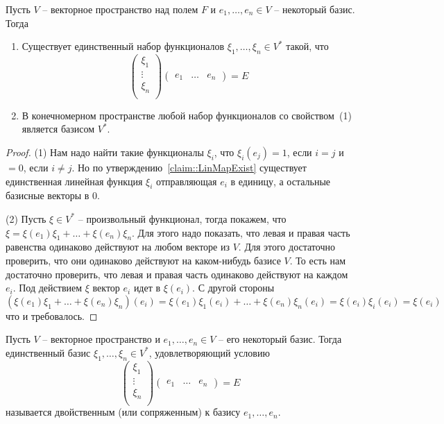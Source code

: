 \begin{claim}\label{claim:DualBasis}
Пусть $V$ -- векторное пространство над полем $F$ и $e_1,\ldots,e_n\in V$ -- некоторый базис. Тогда
\begin{enumerate}
\item Существует единственный набор функционалов $\xi_1,\ldots,\xi_n\in V^*$ такой, что 
\[
\begin{pmatrix}
{\xi_1}\\{\vdots}\\{\xi_n}\\
\end{pmatrix}
\begin{pmatrix}
{e_1}&{\ldots}&{e_n}
\end{pmatrix}
=
E
\]

\item В конечномерном пространстве любой набор функционалов со свойством~(1) является базисом $V^*$.
\end{enumerate}
\end{claim}
\begin{proof}
(1) Нам надо найти такие функционалы $\xi_i$, что $\xi_i(e_j) = 1$, если $i = j$ и $ = 0$, если $i\neq j$. Но по утверждению~\ref{claim::LinMapExist} существует единственная линейная функция $\xi_i$ отправляющая $e_i$ в единицу, а остальные базисные векторы в $0$. 

(2) Пусть $\xi \in V^*$ -- произвольный функционал, тогда покажем, что $\xi = \xi(e_1)\xi_1 + \ldots + \xi(e_n)\xi_n$. Для этого надо показать, что левая и правая часть равенства одинаково действуют на любом векторе из $V$. Для этого достаточно проверить, что они одинаково действуют на каком-нибудь базисе $V$. То есть нам достаточно проверить, что левая и правая часть одинаково действуют на каждом $e_i$. Под действием $\xi$ вектор $e_i$ идет в $\xi(e_i)$. С другой стороны
\[
(\xi(e_1)\xi_1 + \ldots + \xi(e_n)\xi_n)(e_i) = \xi(e_1)\xi_1(e_i) + \ldots + \xi(e_n)\xi_n(e_i) = \xi(e_i)\xi_i(e_i) = \xi(e_i)
\]
что и требовалось.
\end{proof}

\begin{definition}\label{def::DualBasis}
Пусть $V$ -- векторное пространство и $e_1,\ldots,e_n\in V$ -- его некоторый базис. Тогда единственный базис $\xi_1,\ldots,\xi_n\in V^*$, удовлетворяющий условию
\[
\begin{pmatrix}
{\xi_1}\\{\vdots}\\{\xi_n}\\
\end{pmatrix}
\begin{pmatrix}
{e_1}&{\ldots}&{e_n}
\end{pmatrix}
=
E
\]
называется двойственным (или сопряженным) к базису $e_1,\ldots,e_n$.
\end{definition}

